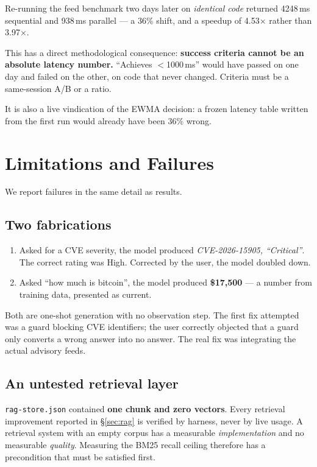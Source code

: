 \documentclass[10pt,twocolumn]{article}
\newcommand{\code}[1]{\texttt{\small #1}}
\begin{document}
Re-running the feed benchmark two days later on \emph{identical code} returned 4248\,ms
sequential and 938\,ms parallel --- a 36\% shift, and a speedup of 4.53$\times$ rather
than 3.97$\times$.

This has a direct methodological consequence: \textbf{success criteria cannot be an
absolute latency number.} ``Achieves $<$1000\,ms'' would have passed on one day and failed
on the other, on code that never changed. Criteria must be a same-session A/B or a ratio.

It is also a live vindication of the EWMA decision: a frozen latency table written from
the first run would already have been 36\% wrong.

\section{Limitations and Failures}
\label{sec:limits}

We report failures in the same detail as results.

\subsection{Two fabrications}

\begin{enumerate}\itemsep2pt
\item Asked for a CVE severity, the model produced \emph{CVE-2026-15905, ``Critical''}.
The correct rating was High. Corrected by the user, the model doubled down.
\item Asked ``how much is bitcoin'', the model produced \textbf{\$17,500} --- a number
from training data, presented as current.
\end{enumerate}

Both are one-shot generation with no observation step. The first fix attempted was a
guard blocking CVE identifiers; the user correctly objected that a guard only converts a
wrong answer into no answer. The real fix was integrating the actual advisory feeds.

\subsection{An untested retrieval layer}

\code{rag-store.json} contained \textbf{one chunk and zero vectors}. Every retrieval
improvement reported in \S\ref{sec:rag} is verified by harness, never by live usage. A
retrieval system with an empty corpus has a measurable \emph{implementation} and no
measurable \emph{quality}. Measuring the BM25 recall ceiling therefore has a precondition
that must be satisfied first.
\end{document}

